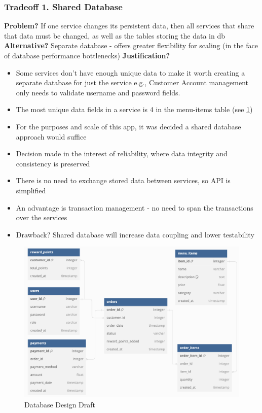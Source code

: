 \documentclass{article}
\begin{document}
\subsubsection*{Tradeoff 1. Shared Database}
\begin{minipage}{\dimexpr\textwidth-0.25cm}
\textbf{Problem?} If one service changes its persistent data, then all services that share that data must be changed, as well as the tables storing the data in db
\hfill \break \textbf{Alternative?} Separate database - offers greater flexibility for scaling (in the face of database performance bottlenecks)
\hfill \break \textbf{Justification?}
\begin{itemize}
    \item Some services don't have enough unique data to make it worth creating a separate database for just the service e.g., Customer Account management only needs to validate username and password fields.
    \item The most unique data fields in a service is 4 in the menu-items table (see \ref{fig:db})
    \item For the purposes and scale of this app, it was decided a shared database approach would suffice
    \item Decision made in the interest of reliability, where data integrity and consistency is preserved
    \item There is no need to exchange stored data between services, so API is simplified
    \item An advantage is transaction management - no need to span the transactions over the services
    \item Drawback? Shared database will increase data coupling and lower testability
\end{itemize}
\end{minipage}
\begin{figure}
    \centering
    \includegraphics[width=0.75\linewidth]{model/db_diagram.png}
    \caption{Database Design Draft}
    \label{fig:db}
\end{figure}
\end{document}
